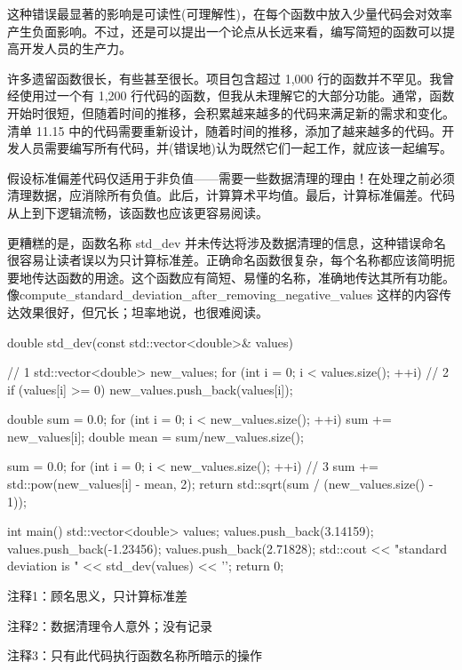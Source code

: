 这种错误最显著的影响是可读性(可理解性)，在每个函数中放入少量代码会对效率产生负面影响。不过，还是可以提出一个论点从长远来看，编写简短的函数可以提高开发人员的生产力。


许多遗留函数很长，有些甚至很长。项目包含超过 1,000 行的函数并不罕见。我曾经使用过一个有 1,200 行代码的函数，但我从未理解它的大部分功能。通常，函数开始时很短，但随着时间的推移，会积累越来越多的代码来满足新的需求和变化。清单 11.15 中的代码需要重新设计，随着时间的推移，添加了越来越多的代码。开发人员需要编写所有代码，并(错误地)认为既然它们一起工作，就应该一起编写。

假设标准偏差代码仅适用于非负值——需要一些数据清理的理由！在处理之前必须清理数据，应消除所有负值。此后，计算算术平均值。最后，计算标准偏差。代码从上到下逻辑流畅，该函数也应该更容易阅读。

更糟糕的是，函数名称 std\_dev 并未传达将涉及数据清理的信息，这种错误命名很容易让读者误以为只计算标准差。正确命名函数很复杂，每个名称都应该简明扼要地传达函数的用途。这个函数应有简短、易懂的名称，准确地传达其所有功能。像compute\_standard\_deviation\_after\_removing\_negative\_values 这样的内容传达效果很好，但冗长；坦率地说，也很难阅读。


\begin{cpp}
double std_dev(const std::vector<double>& values) { // 1
  std::vector<double> new_values;
  for (int i = 0; i < values.size(); ++i) // 2
    if (values[i] >= 0)
      new_values.push_back(values[i]);

      double sum = 0.0;
  for (int i = 0; i < new_values.size(); ++i)
    sum += new_values[i];
  double mean = sum/new_values.size();

  sum = 0.0;
  for (int i = 0; i < new_values.size(); ++i) // 3
    sum += std::pow(new_values[i] - mean, 2);
  return std::sqrt(sum / (new_values.size() - 1));
}
int main() {
  std::vector<double> values;
  values.push_back(3.14159);
  values.push_back(-1.23456);
  values.push_back(2.71828);
  std::cout << "standard deviation is " << std_dev(values) << '\n';
  return 0;
}
\end{cpp}

{\footnotesize
注释1：顾名思义，只计算标准差

注释2：数据清理令人意外；没有记录

注释3：只有此代码执行函数名称所暗示的操作
}


